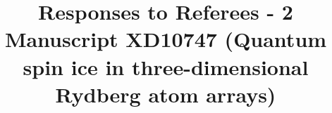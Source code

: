 \documentclass[
onecolumn,
superscriptaddress,
longbibliography,
nofootinbib,
 amsmath,amssymb,
 aps,
prb
]{revtex4-2}
\newcommand{\commentJS}[1]{\textcolor{blue}{\footnotesize{JS: #1}}}
\begin{document}
\title{Responses to Referees - 2\\Manuscript XD10747 (Quantum spin ice in three-dimensional Rydberg atom arrays)}
\maketitle







\end{document}
